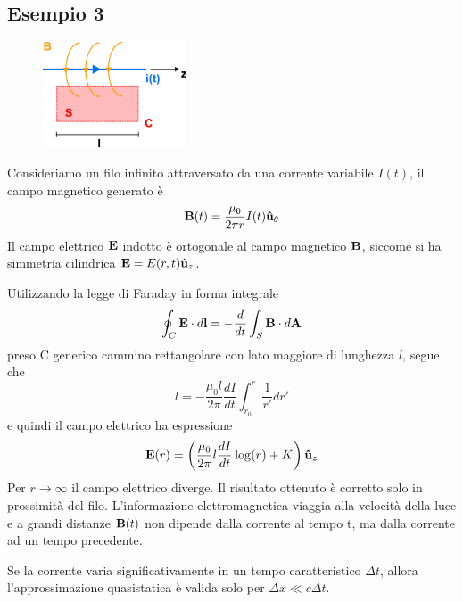 \subsection{Esempio 3}

\begin{figure}  %
    \centering
    \includegraphics[width=0.38\textwidth]{images/filo_infinto} %
\end{figure}
Consideriamo un filo infinito attraversato da una corrente variabile $I(t)$, il campo magnetico generato \`e
\begin{equation*}
	\bold{B}(t) = \frac{\mu_0}{2 \pi r} I(t) \bold{\hat{u}}_{\theta}
\end{equation*}
Il campo elettrico $\bold{E}$ indotto \`e ortogonale al campo magnetico $\bold{B}$, siccome si ha simmetria cilindrica $\bold{E} = E(r,t) \bold{\hat{u}}_z$.

Utilizzando la legge di Faraday in forma integrale 
\begin{equation*}
	\oint_{C} \bold{E} \cdot d \bold{l} = - \frac{d}{dt} \int_S \bold{B} \cdot d \bold{A}
\end{equation*}
preso C generico cammino rettangolare con lato maggiore di lunghezza $l$, segue che  
\begin{equation*}
	[E(r_0) - E(r)]l = - \frac{\mu_0 l}{2 \pi} \frac{d I}{dt} \int_{r_0}^{r} \frac{1}{r'}dr'
\end{equation*}
e quindi il campo elettrico ha espressione
\begin{equation*}
	\bold{E}(r) = \left(\frac{\mu_0}{2\pi}l \frac{dI}{dt} \log(r) + K\right)\bold{\hat{u}}_z
\end{equation*}
Per $r \to \infty$ il campo elettrico diverge. Il risultato ottenuto \`e corretto solo in prossimit\`a del filo. L'informazione elettromagnetica viaggia alla velocit\`a della luce e a grandi distanze $\bold{B}(t)$ non dipende dalla corrente al tempo t, ma dalla corrente ad un tempo precedente.
\newline

Se la corrente varia significativamente in un tempo caratteristico $\Delta t$, allora l'approssimazione quasistatica \`e valida solo per $\Delta x \ll c \Delta t$. 

